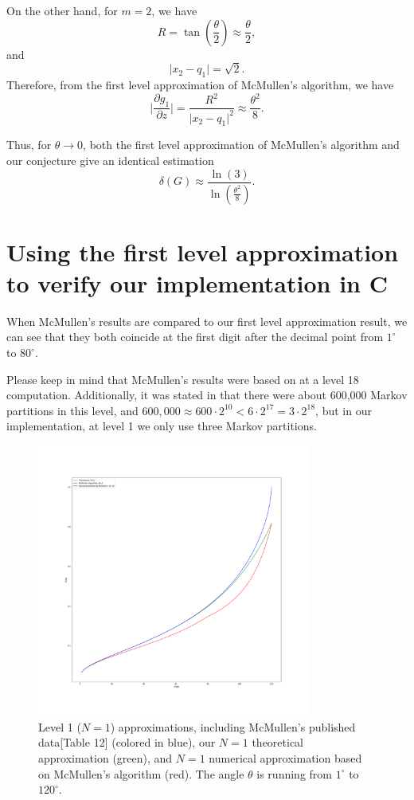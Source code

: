 \documentclass[12pt,oneside]{sfsuthesis}
\theoremstyle{plain} %
\theoremstyle{definition}  %
\theoremstyle{remark}  %
\theoremstyle{plain}
\begin{document}
{On the other hand, for $m=2$, we have 
$$
R=\tan\left(\frac{\theta}{2}\right)\approx \frac{\theta}{2},
$$
and
$$
\vert x_2-q_1\vert=\sqrt{2}.
$$
Therefore, from the first level approximation of McMullen's algorithm, we have
$$
\bigg|\frac{\partial g_1}{\partial z}\bigg|=\frac{R^2}{\vert x_2-q_1\vert^2} \approx \frac{\theta^2}{8}.
$$

Thus, for $\theta\to 0$, both the first level approximation of McMullen's algorithm and our conjecture give an identical estimation
$$
\delta(G)\approx \frac{\ln\left( 3\right)}{\ln\left( \frac{\theta^2}{8}\right)}.
$$




\section{Using the first level approximation to verify our implementation in C}

When McMullen's results\cite{mcmullen1998hausdorff} are compared to our first level approximation result, we can see that they both coincide at the first digit after the decimal point from $1^\circ$ to $80^\circ$.

Please keep in mind that McMullen's results were based on at a level 18 computation. Additionally, it was stated in \cite{mcmullen1998hausdorff} that there were about 600,000 Markov partitions in this level, and $600,000\approx 600\cdot 2^{10} < 6 \cdot 2^{17}= 3 \cdot  2^{18}$, but in our implementation, at level 1 we only use three Markov partitions.

\begin{figure}[H]
\centering
\includegraphics[width=0.8\textwidth]{McMullens example.png}
\caption{Level 1 ($N=1$) approximations, including McMullen's published data\cite{mcmullen1998hausdorff}[Table 12] (colored in blue), our $N=1$ theoretical approximation (green), and $N=1$ numerical approximation based on McMullen's algorithm (red). The angle $\theta$ is running from $1^\circ$ to $120^\circ$. }
\end{figure}

}
\end{document}
